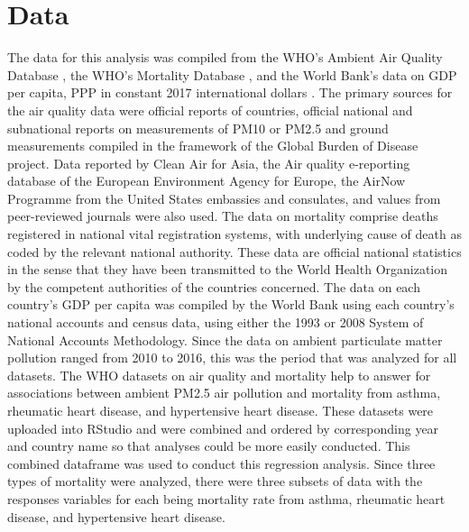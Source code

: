 \documentclass[12pt, letterpaper, twoside]{article}\usepackage[]{graphicx}\usepackage[]{xcolor}
\begin{document}
\section*{Data}
The data for this analysis was compiled from the WHO's Ambient Air Quality
Database \citep{who2022airquality}, the WHO's Mortality Database
\citep{who2022all}, and the World Bank's data on GDP per capita, PPP
in constant 2017 international dollars \citep{worldbank2022}. The primary sources
for the air quality data were official reports of countries, official national
and subnational reports on measurements of PM10 or PM2.5 and ground measurements
compiled in the framework of the Global Burden of Disease project. Data reported
by Clean Air for Asia, the Air quality e-reporting database of the European
Environment Agency for Europe, the AirNow Programme from the United States
embassies and consulates, and values from peer-reviewed journals were also used.
The data on mortality comprise deaths registered in national vital registration
systems, with underlying cause of death as coded by the relevant national
authority. These data are official national statistics in the sense that they
have been transmitted to the World Health Organization by the competent
authorities of the countries concerned. The data on each country's GDP per
capita was compiled by the World Bank using each country's national accounts and
census data, using either the 1993 or 2008 System of National Accounts
Methodology. Since the data on ambient particulate matter pollution ranged from
2010 to 2016, this was the period that was analyzed for all datasets. The WHO
datasets on air quality and mortality help to answer for associations between
ambient PM2.5 air pollution and mortality from asthma, rheumatic heart disease,
and hypertensive heart disease. These datasets were uploaded into RStudio and
were combined and ordered by corresponding year and country name so that analyses
could be more easily conducted. This combined dataframe was used to conduct this
regression analysis. Since three types of mortality were analyzed, there were
three subsets of data with the responses variables for each being mortality
rate from asthma, rheumatic heart disease, and hypertensive heart disease.
\end{document}
